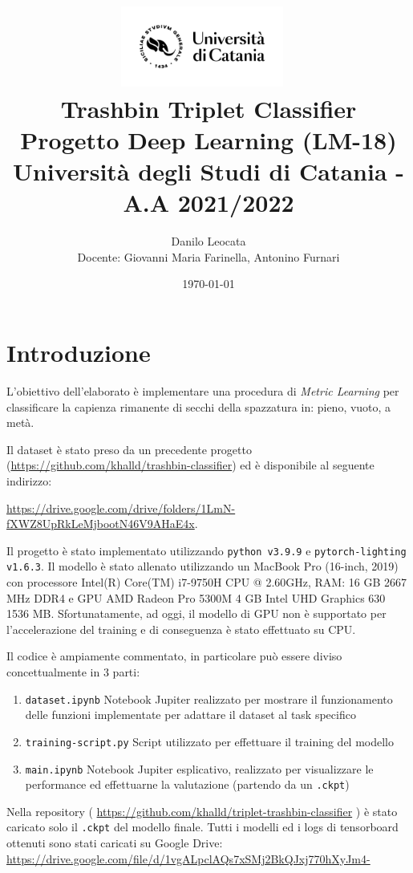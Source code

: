 \documentclass[11pt]{article}
\title{ %
\includegraphics[width=0.4\textwidth]{UniCT-Logo-Nero}~\\
Trashbin Triplet Classifier \\ 
\large Progetto Deep Learning (LM-18) \\ Università degli Studi di Catania - A.A 2021/2022 \\
}
\author{ Danilo Leocata \\ Docente: Giovanni Maria Farinella, Antonino Furnari}
\date{\today}
\begin{document}
\maketitle	
\pagebreak


\section{Introduzione}

L'obiettivo dell'elaborato è implementare una procedura di \textit{Metric Learning} per classificare la 
capienza rimanente di secchi della spazzatura in: pieno, vuoto, a metà.

Il dataset è stato preso da un precedente progetto (\href{https://github.com/khalld/trashbin-classifier}{https://github.com/khalld/trashbin-classifier})
ed è disponibile al seguente indirizzo: \ \ \ \ 

\href{https://drive.google.com/drive/folders/1LmN-fXWZ8UpRkLeMjbootN46V9AHaE4x}{https://drive.google.com/drive/folders/1LmN-fXWZ8UpRkLeMjbootN46V9AHaE4x}.

Il progetto è stato implementato utilizzando \texttt{python v3.9.9} e \texttt{pytorch-lighting v1.6.3}. Il modello è stato allenato utilizzando un MacBook Pro (16-inch, 2019) con processore Intel(R) Core(TM) i7-9750H CPU @ 2.60GHz, RAM: 16 GB 2667 MHz DDR4 e GPU AMD Radeon Pro 5300M 4 GB
Intel UHD Graphics 630 1536 MB. Sfortunatamente, ad oggi, il modello di GPU non è supportato per l'accelerazione del training e di conseguenza è stato effettuato su CPU.

Il codice è ampiamente commentato, in particolare può essere diviso concettualmente in 3 parti:

\begin{enumerate}
    \item \texttt{dataset.ipynb} Notebook Jupiter realizzato per mostrare il funzionamento delle funzioni implementate per adattare il dataset al task specifico
    \item \texttt{training-script.py} Script utilizzato per effettuare il training del modello
    \item \texttt{main.ipynb} Notebook Jupiter esplicativo, realizzato per visualizzare le performance ed effettuarne la valutazione (partendo da un \texttt{.ckpt})
\end{enumerate}

Nella repository (
\href{https://github.com/khalld/triplet-trashbin-classifier}{https://github.com/khalld/triplet-trashbin-classifier} )
è stato caricato solo il \texttt{.ckpt} del modello finale. Tutti i modelli ed i logs di tensorboard ottenuti sono
stati caricati su Google Drive: \href{https://drive.google.com/file/d/1vgALpclAQs7xSMj2BkQJxj770hXyJm4-}{https://drive.google.com/file/d/1vgALpclAQs7xSMj2BkQJxj770hXyJm4-}
\end{document}
